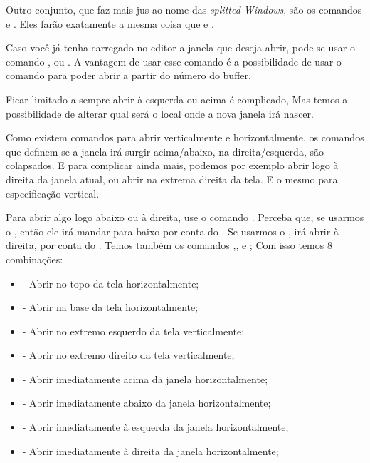 Outro conjunto, que faz mais jus ao nome das \textit{splitted Windows}, são os comandos  e 
.
Eles farão exatamente a mesma coisa que  e .

Caso você já tenha carregado no editor a janela que deseja abrir, pode-se usar o comando
, ou .
A vantagem de usar esse comando é a possibilidade de usar o comando 
para poder abrir a partir do número do buffer.

Ficar limitado a sempre abrir à esquerda ou acima é complicado,
Mas temos a possibilidade de alterar qual será o local onde a nova janela irá nascer.

Como existem comandos para abrir verticalmente e horizontalmente, os comandos que definem
se a janela irá surgir acima/abaixo, na direita/esquerda, são colapsados.
E para complicar ainda mais, podemos por exemplo abrir logo à direita da janela atual, ou
abrir na extrema direita da tela.
E o mesmo para especificação vertical.

Para abrir algo logo abaixo ou à direita, use o comando .
Perceba que, se usarmos o , então ele irá mandar para baixo por conta do .
Se usarmos o , irá abrir à direita, por conta do .
Temos também os comandos ,, e ;
Com isso temos 8 combinações:

\begin{itemize}
    \item {} - Abrir no topo da tela horizontalmente;
    \item {} - Abrir na base da tela horizontalmente;
    \item {} - Abrir no extremo esquerdo da tela verticalmente;
    \item {} - Abrir no extremo direito da tela verticalmente;
    \item {} - Abrir imediatamente acima da janela horizontalmente;
    \item {} - Abrir imediatamente abaixo da janela horizontalmente;
    \item {} - Abrir imediatamente à esquerda da janela horizontalmente;
    \item {} - Abrir imediatamente à direita da janela horizontalmente;
\end{itemize}

